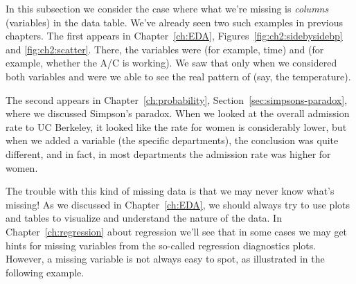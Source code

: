 In this subsection we consider the case where what we're missing
is \emph{columns} (variables) in the data table.
We've already seen two such examples in previous chapters. The first appears
in Chapter~\ref{ch:EDA}, Figures~\ref{fig:ch2:sidebysidebp} and
\ref{fig:ch2:scatter}. There, the variables were  (for example, time) and
 (for example, whether the A/C is working). We saw that only when we
considered both variables  and  were we able to see the real
pattern of  (say, the temperature).

The second appears in Chapter~\ref{ch:probability}, Section~\ref{sec:simpsons-paradox}, where we
discussed Simpson's paradox. When we looked at the overall admission rate
to UC Berkeley, it looked like the rate for women is considerably lower, but when
we added a variable (the specific departments), the conclusion was quite different,
and in fact, in most departments the admission rate was higher for women.

The trouble with this kind of missing data is that we may never know what's missing!
As we discussed in Chapter~\ref{ch:EDA}, we should always try to use plots and tables
to visualize and understand the nature of the data. In
Chapter~\ref{ch:regression} about regression
we'll see that in some cases we may get hints for missing variables from the so-called
regression diagnostics plots.
However, a missing variable is not always easy to spot, as illustrated in the
following example. 

